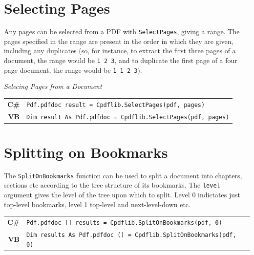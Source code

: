 \documentclass[a4paper]{memoir}
\begin{document}
\section{Selecting Pages}
Any pages can be selected from a PDF with \verb!SelectPages!, giving a range. The pages specified in the range are present in the order in which they are given, including any duplicates (so, for instance, to extract the first three pages of a document, the range would be \verb!1 2 3!, and to duplicate the first page of a four page document, the range would be \verb!1 1 2 3!).
\begin{framed}
\noindent\textit{Selecing Pages from a Document}\\

\noindent\begin{tabular}{rl}
\small\sffamily\textbf{C\#} &
\begin{minipage}{4in}
\small\verb!Pdf.pdfdoc result = Cpdflib.SelectPages(pdf, pages)!
\end{minipage}\\[5mm]
\small\sffamily\textbf{VB} &
\begin{minipage}{4in}
\small\verb!Dim result As Pdf.pdfdoc = Cpdflib.SelectPages(pdf, pages)!
\end{minipage}
\end{tabular}
\end{framed}

\section{Splitting on Bookmarks}
The \verb!SplitOnBookmarks! function can be used to split a document into chapters, sections etc according to the tree structure of its bookmarks. The \verb!level! argument gives the level of the tree upon which to split. Level 0 indictates just top-level bookmarks, level 1 top-level and next-level-down etc.
\begin{framed}
\noindent\begin{tabular}{rl}
\small\sffamily\textbf{C\#} &
\begin{minipage}{4in}
\small\verb!Pdf.pdfdoc [] results = Cpdflib.SplitOnBookmarks(pdf, 0)!
\end{minipage}\\[5mm]
\small\sffamily\textbf{VB} &
\begin{minipage}{4in}
\small\verb!Dim results As Pdf.pdfdoc () = Cpdflib.SplitOnBookmarks(pdf, 0)!
\end{minipage}\\[5mm]
\end{tabular}
\end{framed}
\end{document}
